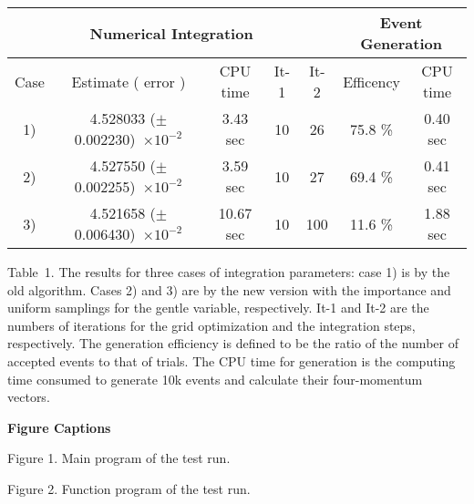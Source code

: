 \onecolumn
\begin{center}
\begin{tabular}{|c|c|c|c|c|c|c|} \hline
\multicolumn{5}{|c|}{ Numerical Integration } & \multicolumn{2}{c|}{ Event Generation } \\ 
\hline Case & Estimate ( error ) & CPU time & It-1 & It-2 & Efficency & CPU time \\ \hline
  1)  & 4.528033 ($\pm$0.002230)~$\times 10^{-2}$ & 3.43 sec & 10 & 26 & 75.8 \% & 0.40 sec \\
\hline
  2)  & 4.527550 ($\pm$0.002255)~$\times 10^{-2}$ & 3.59 sec & 10 & 27 & 69.4 \% & 0.41 sec \\
\hline
  3)  & 4.521658 ($\pm$0.006430)~$\times 10^{-2}$ & 10.67 sec & 10 & 100 & 11.6 \% & 1.88 sec
\\ \hline \end{tabular}
\par
\vskip 1.0cm
\begin{minipage}{12.0cm}
Table~1. The results for three cases of integration parameters: case 1)
is by the old algorithm. Cases 2) and 3) are by the
new version with the importance and uniform samplings for the gentle
variable, respectively. It-1 and It-2 are the numbers of iterations
for the grid optimization and the integration steps, respectively.
The generation efficiency is defined to be the ratio of the number of accepted events to that
 of trials.
The {\small CPU} time for generation is the computing time consumed to generate 10k
events and calculate their four-momentum vectors. 
\end{minipage}
\end{center}
\par
\vskip 4.0cm
\centerline{\Large\bf Figure Captions}
\par\vskip 1.0cm
\begin{center}
\begin{minipage}{8.0cm}
\begin{description}
\item{Figure 1.} Main program of the test run.
\item{Figure 2.} Function program of the test run.
\end{description}
\end{minipage}
\end{center}
\par
